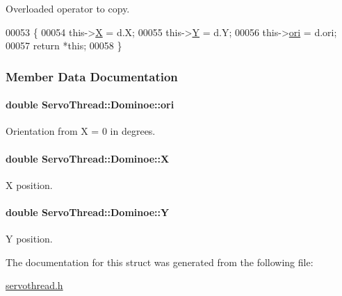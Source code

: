Overloaded operator to copy. 


\begin{DoxyCode}
00053         \{
00054             this->\hyperlink{a00002_a8caa44969c79e0e46576da349957975b}{X} = d.X;
00055             this->\hyperlink{a00002_ae7711996c8204586b6d8a5e657c4b06a}{Y} = d.Y;
00056             this->\hyperlink{a00002_a451efc4d2eb2f1dd10006c6c49846e8d}{ori} = d.ori;
00057             \textcolor{keywordflow}{return} *\textcolor{keyword}{this};
00058         \}
\end{DoxyCode}


\subsubsection{Member Data Documentation}
\hypertarget{a00002_a451efc4d2eb2f1dd10006c6c49846e8d}{}
\paragraph[{ori}]{\setlength{\rightskip}{0pt plus 5cm}double Servo\+Thread\+::\+Dominoe\+::ori}\label{a00002_a451efc4d2eb2f1dd10006c6c49846e8d}


Orientation from X = 0 in degrees. 

\hypertarget{a00002_a8caa44969c79e0e46576da349957975b}{}
\paragraph[{X}]{\setlength{\rightskip}{0pt plus 5cm}double Servo\+Thread\+::\+Dominoe\+::\+X}\label{a00002_a8caa44969c79e0e46576da349957975b}


X position. 

\hypertarget{a00002_ae7711996c8204586b6d8a5e657c4b06a}{}
\paragraph[{Y}]{\setlength{\rightskip}{0pt plus 5cm}double Servo\+Thread\+::\+Dominoe\+::\+Y}\label{a00002_ae7711996c8204586b6d8a5e657c4b06a}


Y position. 



The documentation for this struct was generated from the following file\+:\begin{DoxyCompactItemize}
\item 
\hyperlink{a00024}{servothread.\+h}\end{DoxyCompactItemize}
